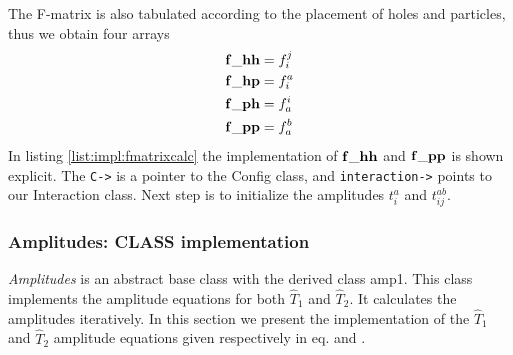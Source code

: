 The F-matrix is also tabulated according to the placement of holes and particles, thus we obtain four arrays
 \begin{align}  
{\bf f\_{hh}}&=f_{i}^{j}\nonumber\\
{\bf f\_{hp}}&=f_{i}^{a}\nonumber\\
{\bf f\_{ph}}&=f_{a}^{i}\nonumber\\
{\bf f\_{pp}}&=f_{a}^{b}
\label{eq:impl:fmatrices}
\end{align}
In listing \ref{list:impl:fmatrixcalc} the implementation of ${\bf f\_{hh}}$ and ${\bf f\_{pp}}$ is shown explicit. The \texttt{C->} is a pointer to the Config class, and \texttt{interaction->} points to our Interaction class. Next step is to initialize the amplitudes $t_i^a$ and $t_{ij}^{ab}$.
%
\subsubsection{ Amplitudes: CLASS implementation}
\emph{Amplitudes} is an abstract base class with the derived class amp1. This class implements the amplitude equations for both $\hat{T}_1$ and $\hat{T}_2$. It calculates the amplitudes iteratively. In this section we present the implementation of the $\hat{T}_1$ and $\hat{T}_2$ amplitude equations given respectively in eq. and . 
%
